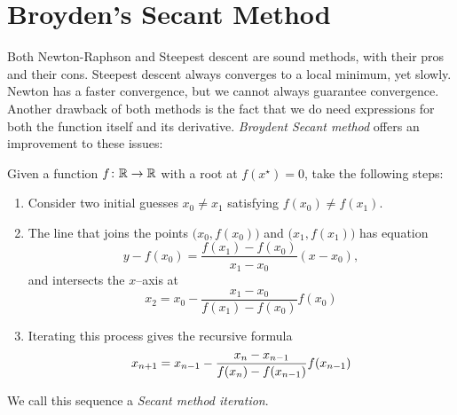 
\section{Broyden's Secant Method}
Both Newton-Raphson and Steepest descent are sound methods, with their pros and their cons.  Steepest descent always converges to a local minimum, yet slowly.  Newton has a faster convergence, but we cannot always guarantee convergence.  Another drawback of both methods is the fact that we do need expressions for both the function itself and its derivative.  \emph{Broydent Secant method} offers an improvement to these issues:

\begin{definition}\label{def:SecantMethod}
Given a function $f \colon \mathbb{R} \to \mathbb{R}$ with a root at $f(x^\star)=0$, take the following steps:
\begin{enumerate}
	\item Consider two initial guesses $x_0 \neq x_1$ satisfying $f(x_0) \neq f(x_1)$.
	\item The line that joins the points $\big(x_0, f(x_0)\big)$ and $\big( x_1, f(x_1) \big)$ has equation
	\begin{equation*}
	y - f(x_0) = \frac{f(x_1)-f(x_0)}{x_1-x_0}(x-x_0), 
	\end{equation*}
	and intersects the $x$--axis at
	\begin{equation*}
	x_2 = x_0 - \frac{x_1 - x_0}{f(x_1)-f(x_0)}f(x_0)
	\end{equation*}
	\item Iterating this process gives the recursive formula
	\begin{equation}\label{equation:SecantMethod}\index{Secant method!iteration}
	x_{n+1} = x_{n-1} - \frac{x_n - x_{n-1}}{f(x_n) - f(x_{n-1})}f(x_{n-1})
	\end{equation}
\end{enumerate}
We call this sequence a \emph{Secant method iteration}.
\end{definition}
